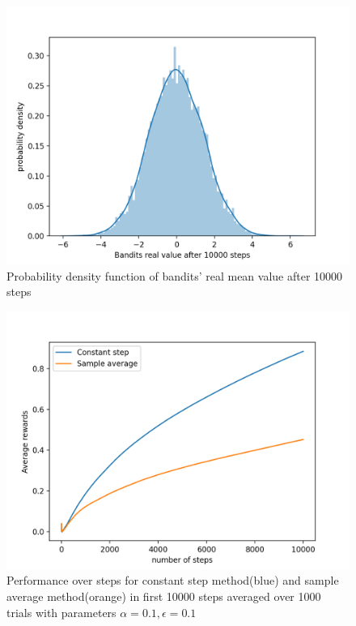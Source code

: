 \documentclass[12pt]{article}
\begin{document}
\begin{figure}
  \centering
     \includegraphics[width=\textwidth]{Figure_6.png}
  \caption{Probability density function of bandits' real mean value after 10000 steps}
\end{figure}


\begin{figure}
  \centering
     \includegraphics[width=\textwidth]{Figure_1.png}
  \caption{Performance over steps for constant step method(blue) and sample average method(orange) in first 10000 steps averaged over 1000 trials with parameters $\alpha = 0.1, \epsilon = 0.1$  }
\end{figure}
\end{document}
